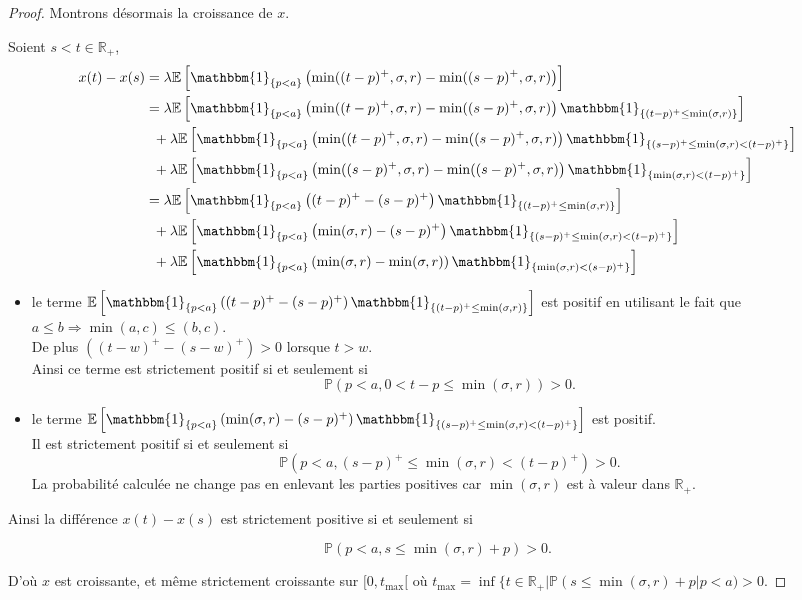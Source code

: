 \documentclass[12pt,a4paper]{article}
\newcommand{\E}[1]{\mathbb{E}\left[ #1 \right]}
\newcommand{\R}{\mathbb{R}}
\newcommand{\1}[1]{\mathbbm{1}_{\{#1\}} }
\theoremstyle{definition}
\begin{document}
{\begin{proof}
Montrons désormais la croissance de $x$.

Soient $s<t \in \R_+$,
\begin{align*}
x(t) - x(s) &= \lambda\E{\1{p<a}\left(\min((t-p)^+,\sigma,r)-\min((s-p)^+,\sigma,r)\right)}\\
&= \lambda\E{\1{p<a}\left(\min((t-p)^+,\sigma,r)-\min((s-p)^+,\sigma,r)\right)\1{(t-p)^+\leq\min(\sigma,r)}}\\
&\;\;+\lambda\E{\1{p<a}\left(\min((t-p)^+,\sigma,r)-\min((s-p)^+,\sigma,r)\right)\1{(s-p)^+\leq \min(\sigma,r)<(t-p)^+}}\\
&\;\;+\lambda\E{\1{p<a}\left(\min((s-p)^+,\sigma,r)-\min((s-p)^+,\sigma,r)\right)\1{ \min(\sigma,r)<(t-p)^+}}\\
&= \lambda\E{\1{p<a}\left((t-p)^+-(s-p)^+\right)\1{(t-p)^+\leq\min(\sigma,r)}}\\
&\;\;+\lambda\E{\1{p<a}\left(\min(\sigma,r)-(s-p)^+\right)\1{(s-p)^+\leq \min(\sigma,r)<(t-p)^+}}\\
&\;\;+\lambda\E{\1{p<a}\left(\min(\sigma,r)-\min(\sigma,r)\right)\1{ \min(\sigma,r)<(s-p)^+}}\\
\end{align*} 
\begin{itemize}
\item le terme $\E{\1{p<a}\left((t-p)^+-(s-p)^+\right)\1{(t-p)^+\leq\min(\sigma,r)}}$ est positif en utilisant le fait que $a\leq b \Rightarrow \min(a,c) \leq (b,c)$.\\
De plus $\left((t-w)^+-(s-w)^+\right) > 0$ lorsque $t>w$.\\
Ainsi ce terme est strictement positif si et seulement si
$$\mathbb{P}\left(p<a, 0<t-p\leq\min(\sigma,r)\right) > 0. $$
\item le terme $\E{\1{p<a}\left(\min(\sigma,r)-(s-p)^+\right)\1{(s-p)^+\leq \min(\sigma,r)<(t-p)^+}}$ est positif.\\
Il est strictement positif si et seulement si
$$\mathbb{P}\left(p<a, (s-p)^+\leq \min(\sigma,r)<(t-p)^+\right) > 0. $$
La probabilité calculée ne change pas en enlevant les parties positives car $\min(\sigma,r)$ est à valeur dans $\R_+$.
\end{itemize}
Ainsi la différence $x(t)-x(s)$ est strictement positive si et seulement si

$$\mathbb{P}\left(p<a, s \leq \min(\sigma,r) + p\right) > 0. $$

D'où $x$ est croissante, et même strictement croissante sur $[0,t_{\max}[$ où $t_{\max} = \inf \{t \in \R_+ | \mathbb{P}\left(s \leq \min(\sigma,r) + p\right|p<a) > 0$.


\end{proof}}
\end{document}

